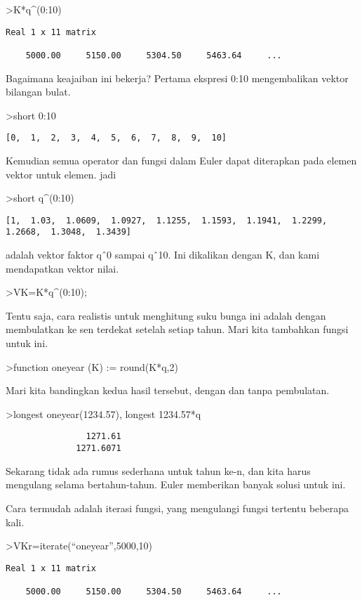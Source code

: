 \documentclass[
]{book}
\begin{document}
\textgreater K*q\^{}(0:10)

\begin{verbatim}
Real 1 x 11 matrix

    5000.00     5150.00     5304.50     5463.64     ...
\end{verbatim}

Bagaimana keajaiban ini bekerja? Pertama ekspresi 0:10 mengembalikan vektor bilangan bulat.

\textgreater short 0:10

\begin{verbatim}
[0,  1,  2,  3,  4,  5,  6,  7,  8,  9,  10]
\end{verbatim}

Kemudian semua operator dan fungsi dalam Euler dapat diterapkan pada elemen vektor untuk elemen. jadi

\textgreater short q\^{}(0:10)

\begin{verbatim}
[1,  1.03,  1.0609,  1.0927,  1.1255,  1.1593,  1.1941,  1.2299,
1.2668,  1.3048,  1.3439]
\end{verbatim}

adalah vektor faktor qˆ0 sampai qˆ10. Ini dikalikan dengan K, dan kami mendapatkan vektor nilai.

\textgreater VK=K*q\^{}(0:10);

Tentu saja, cara realistis untuk menghitung suku bunga ini adalah dengan membulatkan ke sen terdekat setelah setiap tahun. Mari kita tambahkan fungsi untuk ini.

\textgreater function oneyear (K) := round(K*q,2)

Mari kita bandingkan kedua hasil tersebut, dengan dan tanpa pembulatan.

\textgreater longest oneyear(1234.57), longest 1234.57*q

\begin{verbatim}
                1271.61 
              1271.6071 
\end{verbatim}

Sekarang tidak ada rumus sederhana untuk tahun ke-n, dan kita harus mengulang selama bertahun-tahun. Euler memberikan banyak solusi untuk ini.

Cara termudah adalah iterasi fungsi, yang mengulangi fungsi tertentu beberapa kali.

\textgreater VKr=iterate(``oneyear'',5000,10)

\begin{verbatim}
Real 1 x 11 matrix

    5000.00     5150.00     5304.50     5463.64     ...
\end{verbatim}
\end{document}
